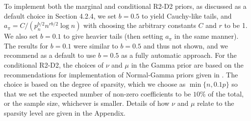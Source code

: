 \documentclass[12pt]{article}
\begin{document}






To implement both the marginal and conditional R2-D2 priors,  as discussed as a default choice in Section 4.2.4, we set $b = 0.5$ to yield Cauchy-like tails, and
$a_\pi = C/(p_n^{b/2} n^{rb/2} \log n)$ with choosing the arbitrary constants $C$ and $r$ to be 1.  We also set $b=0.1$ to give heavier tails (then setting $a_\pi$  in the same manner). The results for $b = 0.1$ were similar to $b = 0.5$ and thus not shown, and we recommend as a default to use $b = 0.5$ as a fully automatic approach.
 For the conditional R2-D2, the choices of $\nu$ and $\mu$ in the Gamma prior are based on the recommendations for implementation of Normal-Gamma priors given in \cite{griffin2010inference}. The choice is based on the degree of sparsity, which we choose as $\min\{n, 0.1p\}$ so that we set the expected number of non-zero coefficients to be $10\%$ of the total, or the sample size, whichever is smaller. Details of how $\nu$ and $\mu$ relate to the sparsity level are given in the Appendix.
\end{document}
